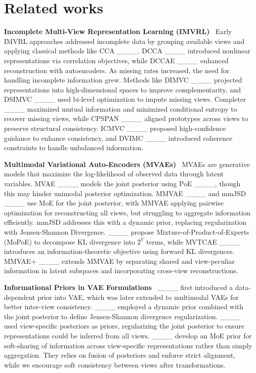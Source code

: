 \section{Related works}
\label{sec:2}

\noindent \textbf{Incomplete Multi-View Representation Learning (IMVRL)}~ Early IMVRL approaches addressed incomplete data by grouping available views and applying classical methods like CCA ____. DCCA ____ introduced nonlinear representations via correlation objectives, while DCCAE ____ enhanced reconstruction with autoencoders. As missing rates increased, the need for handling incomplete information grew. Methods like DIMVC ____ projected representations into high-dimensional spaces to improve complementarity, and DSIMVC ____ used bi-level optimization to impute missing views. Completer ____ maximized mutual information and minimized conditional entropy to recover missing views, while CPSPAN ____ aligned prototypes across views to preserve structural consistency. ICMVC ____ proposed high-confidence guidance to enhance consistency, and DVIMC ____ introduced coherence constraints to handle unbalanced information.

\noindent \textbf{Multimodal Variational Auto-Encoders (MVAEs)}~ MVAEs are generative models that maximize the log-likelihood of observed data through latent variables. MVAE ____ models the joint posterior using PoE ____, though this may hinder unimodal posterior optimization. MMVAE ____ and mmJSD ____ use MoE for the joint posterior, with MMVAE applying pairwise optimization for reconstructing all views, but struggling to aggregate information efficiently. mmJSD addresses this with a dynamic prior, replacing regularization with Jensen-Shannon Divergence. ____ propose Mixture-of-Product-of-Experts (MoPoE) to decompose KL divergence into $2^V$ terms, while MVTCAE ____ introduces an information-theoretic objective using forward KL divergences. MMVAE+ ____ extends MMVAE by separating shared and view-peculiar information in latent subspaces and incorporating cross-view reconstructions.

\noindent \textbf{Informational Priors in VAE Formulations}~ ____ first introduced a data-dependent prior into VAE, which was later extended to multimodal VAEs for better inter-view consistency. ____ employed a dynamic prior combined with the joint posterior to define Jensen-Shannon divergence regularization. ____ used view-specific posteriors as priors, regularizing the joint posterior to ensure representations could be inferred from all views. ____ develop an MoE prior for soft-sharing of information across view-specific representations rather than simply aggregation. They relies on fusion of posteriors and enforce strict alignment, while we encourage soft consistency between views after transformations.




